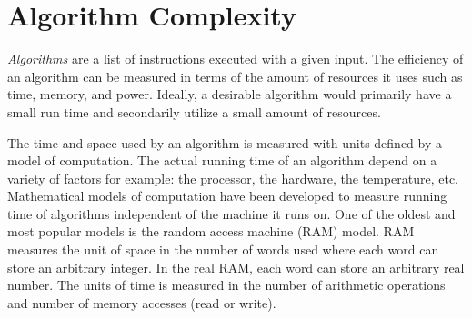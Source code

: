 \documentclass[10pt]{CSUNthesis}
\theoremstyle{plain}%
\theoremstyle{definition}
\theoremstyle{remark}
\begin{document}
\section{Algorithm Complexity}
\textit{Algorithms} are a list of instructions executed with a given input.  
The efficiency of an algorithm can be measured in terms of the amount of resources it uses such as time, memory, and power.
Ideally, a desirable algorithm would primarily have a small run time and secondarily utilize a small amount of resources.

The time and space used by an algorithm is measured with units defined by a model of computation.
The actual running time of an algorithm depend on a variety of factors for example: the processor, the hardware, the temperature, etc.
Mathematical models of computation have been developed to measure running time of algorithms independent of the machine it runs on.
One of the oldest and most popular models is the random access machine (RAM) model.
RAM measures the unit of space in the number of words used where each word can store an arbitrary integer.
In the real RAM, each word can store an arbitrary real number.
The units of time is measured in the number of arithmetic operations and number of memory accesses (read or write). 
\end{document}

